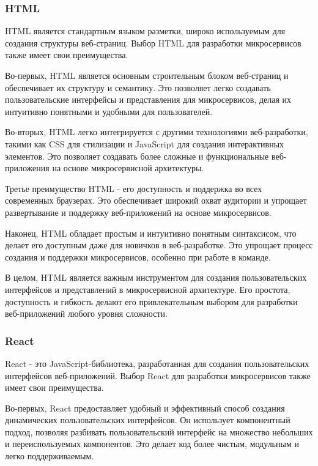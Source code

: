 \subsubsection{HTML}

HTML является стандартным языком разметки, широко используемым для создания структуры веб-страниц. Выбор HTML для разработки микросервисов также имеет свои преимущества.

Во-первых, HTML является основным строительным блоком веб-страниц и обеспечивает их структуру и семантику. Это позволяет легко создавать пользовательские интерфейсы и представления для микросервисов, делая их интуитивно понятными и удобными для пользователей.

Во-вторых, HTML легко интегрируется с другими технологиями веб-разработки, такими как CSS для стилизации и JavaScript для создания интерактивных элементов. Это позволяет создавать более сложные и функциональные веб-приложения на основе микросервисной архитектуры.

Третье преимущество HTML - его доступность и поддержка во всех современных браузерах. Это обеспечивает широкий охват аудитории и упрощает развертывание и поддержку веб-приложений на основе микросервисов.

Наконец, HTML обладает простым и интуитивно понятным синтаксисом, что делает его доступным даже для новичков в веб-разработке. Это упрощает процесс создания и поддержки микросервисов, особенно при работе в команде.

В целом, HTML является важным инструментом для создания пользовательских интерфейсов и представлений в микросервисной архитектуре. Его простота, доступность и гибкость делают его привлекательным выбором для разработки веб-приложений любого уровня сложности.

\subsubsection{React}

React - это JavaScript-библиотека, разработанная для создания пользовательских интерфейсов веб-приложений. Выбор React для разработки микросервисов также имеет свои преимущества.

Во-первых, React предоставляет удобный и эффективный способ создания динамических пользовательских интерфейсов. Он использует компонентный подход, позволяя разбивать пользовательский интерфейс на множество небольших и переиспользуемых компонентов. Это делает код более чистым, модульным и легко поддерживаемым.

